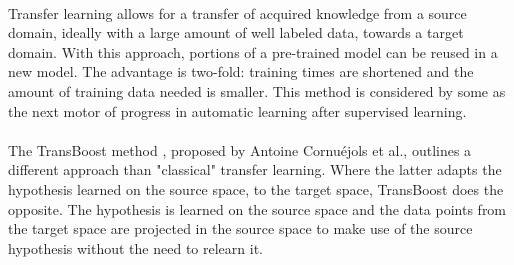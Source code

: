 \documentclass[11 pt]{article}
\begin{document}
\paragraph{}Transfer learning allows for a transfer of acquired knowledge from a source domain, ideally with a large amount of well labeled data, towards a target domain. With this approach, portions of a pre-trained model can be reused in a new model. The advantage is two-fold: training times are shortened and the amount of training data needed is smaller. This method is considered by some as the next motor of progress in automatic learning after supervised learning. 

\paragraph{}The TransBoost method \cite{transboost}, proposed by Antoine Cornuéjols et al., outlines a different approach than "classical" transfer learning. Where the latter adapts the hypothesis learned on the source space, to the target space, TransBoost does the opposite. The hypothesis is learned on the source space and the data points from the target space are projected in the source space to make use of the source hypothesis without the need to relearn it.

\end{document}
